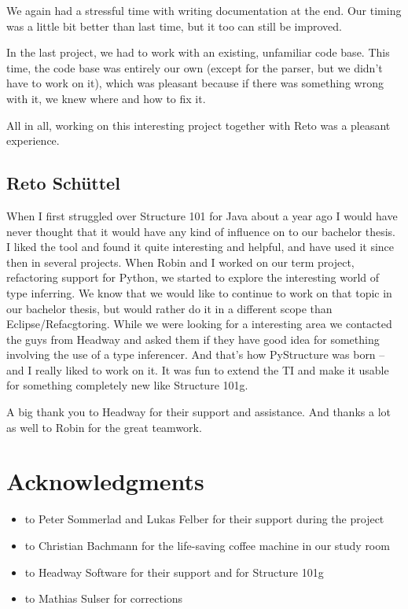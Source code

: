 \documentclass[12pt,halfparskip,DIV11,BCOR10mm]{scrreprt}
\begin{document}
We again had a stressful time with writing documentation at the end. Our timing was a little bit better than last time, but it too can still be improved.

In the last project, we had to work with an existing, unfamiliar code base. This time, the code base was entirely our own (except for the parser, but we didn't have to work on it), which was pleasant because if there was something wrong with it, we knew where and how to fix it.

All in all, working on this interesting project together with Reto was a pleasant experience.

\subsection{Reto Schüttel}

When I first struggled over Structure 101 for Java about a year ago I would have never thought that it would have any kind of influence on to our bachelor thesis. I liked the tool and found it quite interesting and helpful, and have used it since then in several projects. When Robin and I worked on our term project, refactoring support for Python, we started to explore the interesting world of type inferring. We know that we would like to continue to work on that topic in our bachelor thesis, but would rather do it in a different scope than Eclipse/Refacgtoring. While we were looking for a interesting area we contacted the guys from Headway and asked them if they have good idea for something involving the use of a type inferencer. And that's how PyStructure was born – and I really liked to work on it. It was fun to extend the TI and make it usable for something completely new like Structure 101g.

A big thank you to Headway for their support and assistance. And thanks a lot as well to Robin for the great teamwork.


\section{Acknowledgments}

\begin{itemize}
    \item to Peter Sommerlad and Lukas Felber for their support during the project
    \item to Christian Bachmann for the life-saving coffee machine in our study room
    \item to Headway Software for their support and for Structure 101g
    \item to Mathias Sulser for corrections
\end{itemize}
\end{document}

